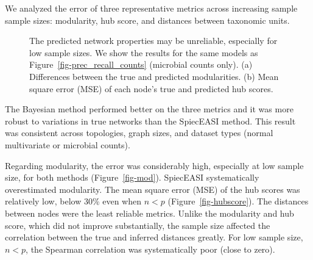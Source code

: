 \documentclass[
  a4paper,
]{article}
\begin{document}
We analyzed the error of three representative metrics across increasing
sample sample sizes: modularity, hub score, and distances between
taxonomic units.

\begin{figure}

\begin{minipage}[t]{\linewidth}

{\centering 


}

\subcaption{\label{fig-mod}}
\end{minipage}%
\newline
\begin{minipage}[t]{\linewidth}

{\centering 


}

\subcaption{\label{fig-hubscore}}
\end{minipage}%

\caption{\label{fig-regression}The predicted network properties may be
unreliable, especially for low sample sizes. We show the results for the
same models as Figure~\ref{fig-prec_recall_counts} (microbial counts
only). (a) Differences between the true and predicted modularities. (b)
Mean square error (MSE) of each node's true and predicted hub scores.}

\end{figure}

The Bayesian method performed better on the three metrics and it was
more robust to variations in true networks than the SpiecEASI method.
This result was consistent across topologies, graph sizes, and dataset
types (normal multivariate or microbial counts).

Regarding modularity, the error was considerably high, especially at low
sample size, for both methods (Figure~\ref{fig-mod}). SpiecEASI
systematically overestimated modularity. The mean square error (MSE) of
the hub scores was relatively low, below 30\% even when \(n<p\)
(Figure~\ref{fig-hubscore}). The distances between nodes were the least
reliable metrics. Unlike the modularity and hub score, which did not
improve substantially, the sample size affected the correlation between
the true and inferred distances greatly. For low sample size, \(n<p\),
the Spearman correlation was systematically poor (close to zero).
\end{document}
